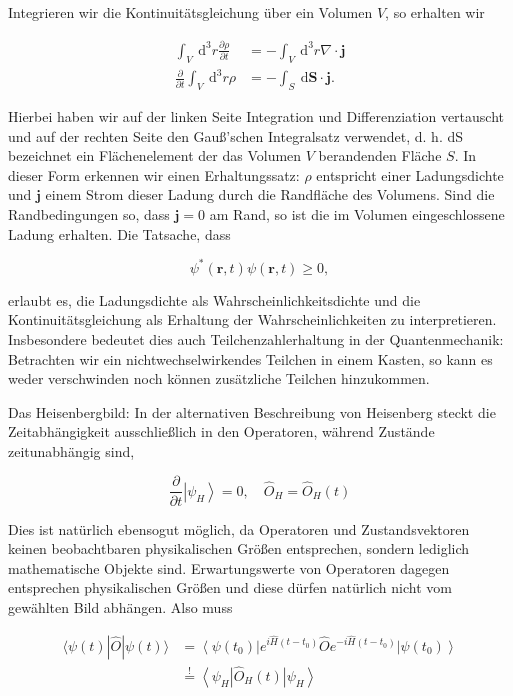 \documentclass[10pt, letterpaper]{article}
\begin{document}
Integrieren wir die Kontinuitätsgleichung über ein Volumen $V$, so erhalten wir

$$
\begin{aligned}
\int_{V} \mathrm{~d}^{3} r \frac{\partial \rho}{\partial t} & =-\int_{V} \mathrm{~d}^{3} r \nabla \cdot \mathbf{j} \\
\frac{\partial}{\partial t} \int_{V} \mathrm{~d}^{3} r \rho & =-\int_{S} \mathrm{~d} \mathbf{S} \cdot \mathbf{j} .
\end{aligned}
$$

Hierbei haben wir auf der linken Seite Integration und Differenziation vertauscht und auf der rechten Seite den Gauß'schen Integralsatz verwendet, d. h. dS bezeichnet ein Flächenelement der das Volumen $V$ berandenden Fläche $S$. In dieser Form erkennen wir einen Erhaltungssatz: $\rho$ entspricht einer Ladungsdichte und $\mathbf{j}$ einem Strom dieser Ladung durch die Randfläche des Volumens. Sind die Randbedingungen so, dass $\mathbf{j}=0$ am Rand, so ist die im Volumen eingeschlossene Ladung erhalten. Die Tatsache, dass

$$
\psi^{*}(\mathbf{r}, t) \psi(\mathbf{r}, t) \geqslant 0,
$$

erlaubt es, die Ladungsdichte als Wahrscheinlichkeitsdichte und die Kontinuitätsgleichung als Erhaltung der Wahrscheinlichkeiten zu interpretieren. Insbesondere bedeutet dies auch Teilchenzahlerhaltung in der Quantenmechanik: Betrachten wir ein nichtwechselwirkendes Teilchen in einem Kasten, so kann es weder verschwinden noch können zusätzliche Teilchen hinzukommen.

Das Heisenbergbild: In der alternativen Beschreibung von Heisenberg steckt die Zeitabhängigkeit ausschließlich in den Operatoren, während Zustände zeitunabhängig sind,

$$
\frac{\partial}{\partial t}\left|\psi_{H}\right\rangle=0, \quad \hat{O}_{H}=\hat{O}_{H}(t)
$$

Dies ist natürlich ebensogut möglich, da Operatoren und Zustandsvektoren keinen beobachtbaren physikalischen Größen entsprechen, sondern lediglich mathematische Objekte sind. Erwartungswerte von Operatoren dagegen entsprechen physikalischen Größen und diese dürfen natürlich nicht vom gewählten Bild abhängen. Also muss

$$
\begin{aligned}
\langle\psi(t)| \hat{O}|\psi(t)\rangle & =\left\langle\psi\left(t_{0}\right)\right| e^{i \hat{H}\left(t-t_{0}\right)} \hat{O} e^{-i \hat{H}\left(t-t_{0}\right)}\left|\psi\left(t_{0}\right)\right\rangle \\
& \stackrel{!}{=}\left\langle\psi_{H}\right| \hat{O}_{H}(t)\left|\psi_{H}\right\rangle
\end{aligned}
$$
\end{document}
